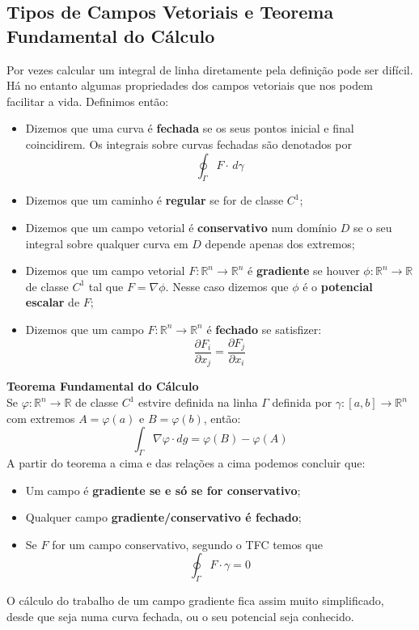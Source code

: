 \documentclass{article}
\newcommand{\R}{\mathbb{R}}
\begin{document}
\subsection{Tipos de Campos Vetoriais e Teorema Fundamental do Cálculo}
Por vezes calcular um integral de linha diretamente pela definição pode ser difícil. Há no entanto algumas propriedades dos campos vetoriais que nos podem facilitar a vida. Definimos então:
\begin{itemize}
	\item Dizemos que uma curva é \textbf{fechada} se os seus pontos inicial e final coincidirem. Os integrais sobre curvas fechadas são denotados por
$$ \oint_\Gamma F \cdot \, d \gamma $$
	\item Dizemos que um caminho é \textbf{regular} se for de classe $C^1$;
	\item Dizemos que um campo vetorial é \textbf{conservativo} num domínio $D$ se o seu integral sobre qualquer curva em $D$ depende apenas dos extremos;
	\item Dizemos que um campo vetorial $F: \R^n \to \R^n$ é \textbf{gradiente} se houver $\phi: \R^n \to \R$ de classe $C^1$ tal que $F = \nabla \phi$. Nesse caso dizemos que $\phi$ é o \textbf{potencial escalar} de $F$;
	\item Dizemos que um campo $F: \R^n \to \R^n$ é \textbf{fechado} se satisfizer:
	$$ \frac{\partial F_i}{\partial x_j} = \frac{\partial F_j}{\partial x_i} $$
\end{itemize}

\textbf{Teorema Fundamental do Cálculo}\\
Se $\varphi:\R^n \to \R$ de classe $C^1$ estvire definida na linha $\Gamma$ definida por $\gamma:[a,b] \to \R^n$ com extremos $A = \varphi(a)$ e $B = \varphi(b)$, então:
$$ \int_\Gamma \nabla \varphi \cdot dg = \varphi(B) - \varphi(A) $$
A partir do teorema a cima e das relações a cima podemos concluir que:
\begin{itemize}
	\item Um campo é \textbf{gradiente se e só se for conservativo};
	\item Qualquer campo \textbf{gradiente/conservativo é fechado};
	\item Se $F$ for um campo conservativo, segundo o TFC temos que
	$$ \oint_\Gamma F \cdot \gamma = 0 $$
\end{itemize}

O cálculo do trabalho de um campo gradiente fica assim muito simplificado, desde que seja numa curva fechada, ou o seu potencial seja conhecido.
\end{document}
